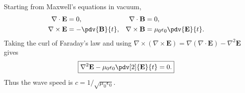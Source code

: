 Starting from Maxwell's equations in vacuum,
\begin{align}
\nabla\cdot\mathbf E &= 0, & \nabla\cdot\mathbf B &= 0,\\
\nabla\times\mathbf E &= -\pdv{\mathbf B}{t}, &
\nabla\times\mathbf B &= \mu_0\epsilon_0\pdv{\mathbf E}{t}.
\end{align}
Taking the curl of Faraday's law and using
$\nabla\times(\nabla\times\mathbf E)=\nabla(\nabla\cdot\mathbf E)-\nabla^2\mathbf E$ gives
\begin{equation}
\boxed{\nabla^2\mathbf E-\mu_0\epsilon_0\pdv[2]{\mathbf E}{t}=0.}
\end{equation}
Thus the wave speed is $c=1/\sqrt{\mu_0\epsilon_0}$.
